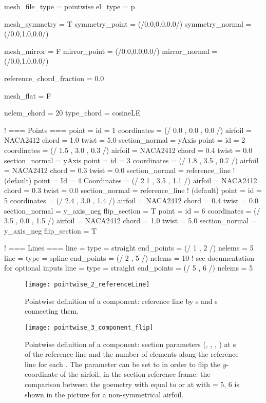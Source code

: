 \begin{inputfile}[frame=single, caption={''Pointwise'' geometry definition }, label={file:pointwise_example_file.in}]
mesh_file_type = pointwise
el_type = p

mesh_symmetry = T
symmetry_point = (/0.0,0.0,0.0/)
symmetry_normal = (/0.0,1.0,0.0/)

mesh_mirror = F
mirror_point = (/0.0,0.0,0.0/)
mirror_normal = (/0.0,1.0,0.0/)

reference_chord_fraction = 0.0

mesh_flat = F

nelem_chord = 20
type_chord = cosineLE

! === Points ===
point = {
  id = 1
  coordinates = (/ 0.0 , 0.0 , 0.0 /)
  airfoil = NACA2412
  chord = 1.0
  twist = 5.0
  section_normal = yAxis
}
point = {
  id = 2
  coordinates = (/ 1.5 , 3.0 , 0.3 /)
  airfoil = NACA2412
  chord = 0.4
  twist = 0.0
  section_normal = yAxis
}
point = {
  id = 3
  coordinates = (/ 1.8 , 3.5 , 0.7 /)
  airfoil = NACA2412
  chord = 0.3
  twist = 0.0
  section_normal = reference_line ! (default)
}
point = {
  Id = 4
  Coordinates = (/ 2.1 , 3.5 , 1.1 /)
  airfoil = NACA2412
  chord = 0.3
  twist = 0.0
  section_normal = reference_line ! (default)
}
point = {
  id = 5
  coordinates = (/ 2.4 , 3.0 , 1.4 /)
  airfoil = NACA2412
  chord = 0.4
  twist = 0.0
  section_normal = y_axis_neg
  flip_section = T
}
point = {
  id = 6
  coordinates = (/ 3.5 , 0.0 , 1.5 /)
  airfoil = NACA2412
  chord = 1.0
  twist = 5.0
  section_normal = y_axis_neg
  flip_section = T
}

! === Lines ===
line = {
  type = straight
  end_points = (/ 1 , 2 /)
  nelems = 5
}
line = {
  type = spline
  end_points = (/ 2 , 5 /)
  nelems = 10
  ! see documentation for optional inputs
}
line = {
  type = straight
  end_points = (/ 5 , 6 /)
  nelems = 5
}

\end{inputfile}
%
\begin{figure}[h!]
\centering
\texttt{[image: pointwise\_2\_referenceLine]}
    \caption{Pointwise definition of a component: reference line by 
    s and s connecting them.}
\label{fig:pointwise_reference_line}
\end{figure}
%
\begin{figure}[h!]
\centering
\texttt{[image: pointwise\_3\_component\_flip]}
    \caption{Pointwise definition of a component: section parameters 
    (, , , ) at 
    s of the reference line and the number  of 
    elements along the reference line for each . 
    The parameter  can be set to  
    in order to flip the $y$-coordinate of the airfoil, in the section 
    reference frame: the comparison between the goemetry with 
     equal to  or   at  with 
     = 5, 6 is shown in the picture for a non-symmetrical airfoil.}
\label{fig:pointwise_component}
\end{figure}


